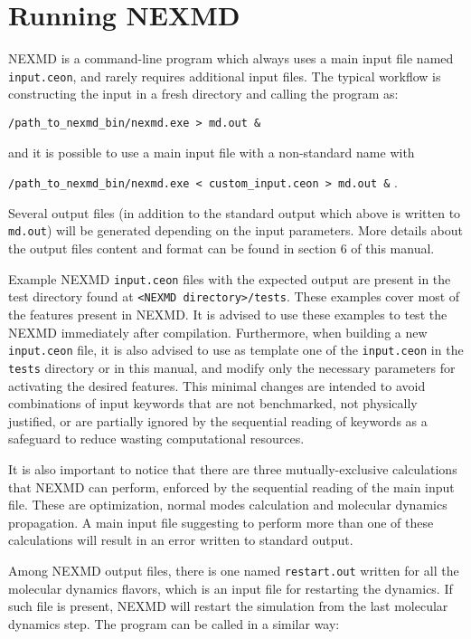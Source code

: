 \section{Running NEXMD}

NEXMD is a command-line program which always uses a main input file named \verb+input.ceon+, and rarely requires additional input files. The typical workflow is constructing the input in a fresh directory and calling the program as:

\vspace{0.5cm}
\verb+/path_to_nexmd_bin/nexmd.exe > md.out &+
\vspace{0.5cm}

and it is possible to use a main input file with a non-standard name with

\vspace{0.5cm}
\verb+/path_to_nexmd_bin/nexmd.exe < custom_input.ceon > md.out &+
\vspace{0.5cm}
.

Several output files (in addition to the standard output which above is written to \verb+md.out+) will be generated depending on the input parameters. More details about the output files content and format can be found in section 6 of this manual.

Example NEXMD \verb+input.ceon+ files with the expected output are present in the test directory found at
\verb+<NEXMD directory>/tests+. These examples cover most of the features present in NEXMD. It is advised to use these examples to test the NEXMD immediately after compilation. Furthermore, when building a new \verb+input.ceon+ file, it is also advised to use as template one of the \verb+input.ceon+ in the \verb+tests+ directory or in this manual, and modify only the necessary parameters for activating the desired features. This minimal changes are intended to avoid combinations of input keywords that are not benchmarked, not physically justified, or are partially ignored by the sequential reading of keywords as a safeguard to reduce wasting computational resources.

It is also important to notice that there are three mutually-exclusive calculations that NEXMD can perform, enforced by the sequential reading of the main input file. These are optimization, normal modes calculation and molecular dynamics propagation. A main input file suggesting to perform more than one of these calculations will result in an error written to standard output.

Among NEXMD output files, there is one named \verb+restart.out+ written for all the molecular dynamics flavors, which is an input file for restarting the dynamics. If such file is present, NEXMD will restart the simulation from the last molecular dynamics step. The program can be called in a similar way:

